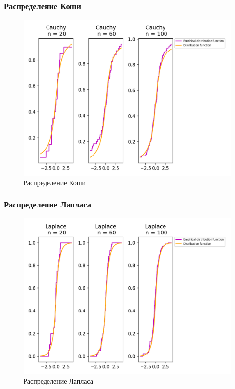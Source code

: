 \subsubsection{Распределение Коши}
\begin{figure}[H]
	\begin{center}
		\includegraphics[scale=0.7]{fig/Cauchy_cde.png}
		\caption{Распределение Коши} 
		\label{pic:pic_name}
	\end{center}
\end{figure}


\subsubsection{Распределение Лапласа}
\begin{figure}[H]
	\begin{center}
		\includegraphics[scale=0.7]{fig/Laplace_cde.png}
		\caption{Распределение Лапласа} 
		\label{pic:pic_name}
	\end{center}
\end{figure}


